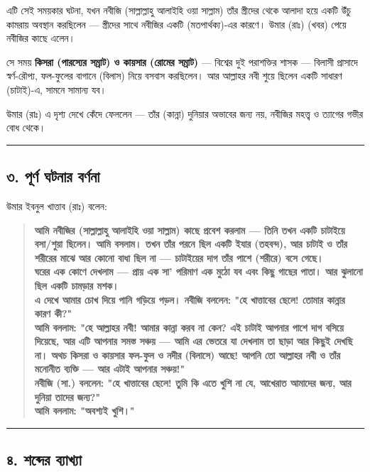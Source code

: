 এটি সেই সময়কার ঘটনা, যখন নবীজি (সাল্লাল্লাহু আলাইহি ওয়া সাল্লাম) তাঁর স্ত্রীদের থেকে আলাদা হয়ে একটি উঁচু কামরায় অবস্থান করছিলেন — স্ত্রীদের সাথে নবীজির একটি  (মতপার্থক্য)-এর কারণে। উমার (রাঃ)  (খবর) পেয়ে নবীজির কাছে এলেন।

সে সময় \textbf{কিসরা (পারস্যের সম্রাট) ও কায়সার (রোমের সম্রাট)} — বিশ্বের দুই পরাশক্তির শাসক — বিলাসী প্রাসাদে স্বর্ণ-রৌপ্য, ফল-ফুলের বাগানে  (বিলাস) নিয়ে বসবাস করছিলেন। আর আল্লাহর নবী শুয়ে ছিলেন একটি সাধারণ  (চাটাই)-এ, সামনে সামান্য যব।

উমার (রাঃ) এ দৃশ্য দেখে কেঁদে ফেললেন — তাঁর  (কান্না) দুনিয়ার অভাবের জন্য নয়, নবীজির মহত্ত্ব ও ত্যাগের গভীর বোধ থেকে।

\medskip\hrule\medskip

\subsection*{৩. পূর্ণ ঘটনার বর্ণনা}

উমার ইবনুল খাত্তাব (রাঃ) বলেন:

\begin{quote}
\textbf{আমি নবীজির (সাল্লাল্লাহু আলাইহি ওয়া সাল্লাম) কাছে প্রবেশ করলাম — তিনি তখন একটি চাটাইয়ে বসা/শুয়া ছিলেন। আমি বসলাম। তখন তাঁর পরনে ছিল একটি ইযার (তহবন্দ), আর চাটাই ও তাঁর শরীরের মাঝে আর কোনো বাধা ছিল না — চাটাইয়ের দাগ তাঁর পাশে (শরীরে) বসে গেছে।} \\
\textbf{ঘরের এক কোণে দেখলাম — প্রায় এক সা' পরিমাণ এক মুঠো যব এবং কিছু গাছের পাতা। আর ঝুলানো ছিল একটি চামড়ার মশক।} \\
\textbf{এ দেখে আমার চোখ দিয়ে পানি গড়িয়ে পড়ল। নবীজি বললেন: "হে খাত্তাবের ছেলে! তোমার কান্নার কারণ কী?"} \\
\textbf{আমি বললাম: "হে আল্লাহর নবী! আমার কান্না করব না কেন? এই চাটাই আপনার পাশে দাগ বসিয়ে দিয়েছে, আর এটি আপনার সমস্ত সঞ্চয় — আমি এর ভেতরে যা দেখলাম তা ছাড়া আর কিছুই দেখছি না। অথচ কিসরা ও কায়সার ফল-ফুল ও নদীর (বিলাসে) আছে! আপনি তো আল্লাহর নবী ও তাঁর মনোনীত ব্যক্তি — আর এটাই আপনার সঞ্চয়!"} \\
\textbf{নবীজি (সা.) বললেন: "হে খাত্তাবের ছেলে! তুমি কি এতে খুশি না যে, আখেরাত আমাদের জন্য, আর দুনিয়া তাদের জন্য?"} \\
\textbf{আমি বললাম: "অবশ্যই খুশি।"}
\end{quote}

\medskip\hrule\medskip

\subsection*{৪. শব্দের ব্যাখ্যা}

